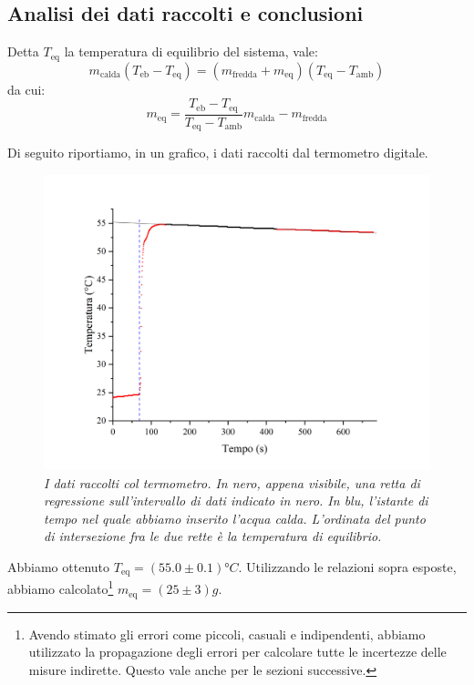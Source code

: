 \documentclass{article}
\begin{document}
\subsection{Analisi dei dati raccolti e conclusioni}
Detta $T_\text{eq}$ la temperatura di equilibrio del sistema, vale:
\[
m_\text{calda} (T_\text{eb} - T_\text{eq}) =
(m_\text{fredda} + m_\text{eq})(T_\text{eq} - T_\text{amb})
\]
da cui:
\[
m_\text{eq} = \frac{T_\text{eb}-T_\text{eq}}{T_\text{eq}-T_\text{amb}} m_\text{calda} - m_\text{fredda}
\]

Di seguito riportiamo, in un grafico, i dati raccolti dal termometro digitale.

\begin{center}
    \begin{figure}[H]
        \includegraphics[trim={2cm 1cm 2cm 2.1cm},clip,width=\textwidth]{img/RegH2O.jpg}
        \caption{\emph{I dati raccolti col termometro.
        In nero, appena visibile, una retta di regressione sull'intervallo di dati indicato in nero.
        In blu, l'istante di tempo nel quale abbiamo inserito l'acqua calda.
        L'ordinata del punto di intersezione fra le due rette è la temperatura di equilibrio.
        }}
    \end{figure}
\end{center}

Abbiamo ottenuto $T_\text{eq} = \left(55.0\pm0.1\right)\unit{\degree C}$.
Utilizzando le relazioni sopra esposte, abbiamo calcolato\footnote{
    Avendo stimato gli errori come piccoli, casuali e indipendenti,
    abbiamo utilizzato la propagazione degli errori per calcolare tutte le
    incertezze delle misure indirette.
    Questo vale anche per le sezioni successive.
} $m_\text{eq} = \left(25\pm3\right)\unit{g}$.
\end{document}
